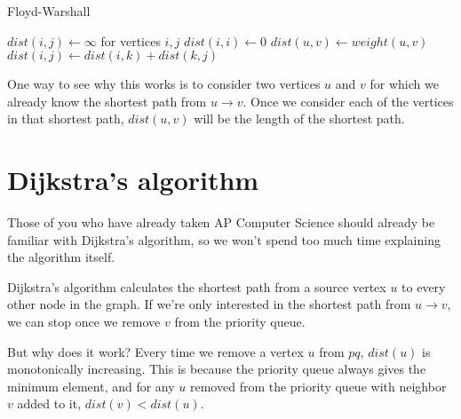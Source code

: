 \documentclass{article}
\begin{document}
\begin{algorithm}[H]
\caption{Floyd-Warshall}
\begin{algorithmic}
\State $dist(i, j) \gets \infty$ for vertices $i, j$
    \State $dist(i,i) \gets 0$
\EndFor
{}
	\State $dist(u,v) \gets weight(u,v)$
\EndFor
{}
            	\State $dist(i,j) \gets dist(i,k)+dist(k,j)$
            \EndIf
        \EndFor
    \EndFor
\EndFor
\end{algorithmic}
\end{algorithm}

One way to see why this works is to consider two vertices $u$ and $v$ for which we already know the shortest path from $u \rightarrow v$. Once we consider each of the vertices in that shortest path, $dist(u,v)$ will be the length of the shortest path.


\section{Dijkstra's algorithm}

Those of you who have already taken AP Computer Science should already be familiar with Dijkstra's algorithm, so we won't spend too much time explaining the algorithm itself.

Dijkstra's algorithm calculates the shortest path from a source vertex $u$ to every other node in the graph. If we're only interested in the shortest path from $u \rightarrow v$, we can stop once we remove $v$ from the priority queue.

But why does it work? Every time we remove a vertex $u$ from $pq$, $dist(u)$ is monotonically increasing. This is because the priority queue always gives the minimum element, and for any $u$ removed from the priority queue with neighbor $v$ added to it, $dist(v) < dist(u)$.
\end{document}
